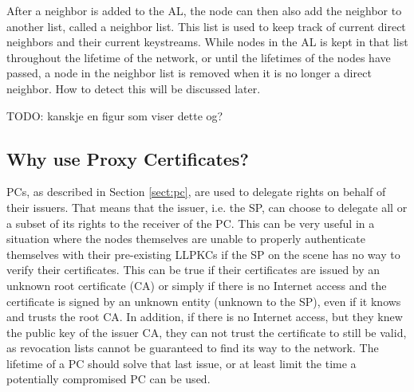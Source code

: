 
After a neighbor is added to the \ac{AL}, the node can then also add the
neighbor to another list, called a neighbor list. This list is used to keep
track of current direct neighbors and their current keystreams. While nodes in
the \ac{AL} is kept in that list throughout the lifetime of the network, or
until the lifetimes of the nodes have passed, a node in the neighbor list is
removed when it is no longer a direct neighbor. How to detect this will be
discussed later.

TODO: kanskje en figur som viser dette og?

\subsection{Why use Proxy Certificates?}
\acp{PC}, as described in Section \ref{sect:pc}, are used to delegate
rights on behalf of their issuers. That means that the issuer, i.e. the \ac{SP},
can choose to delegate all or a subset of its rights to the receiver of the
\ac{PC}. This can be very useful in a situation where the nodes themselves are
unable to properly authenticate themselves with their pre-existing \acp{LLPKC}
if the \ac{SP} on the scene has no way to verify their certificates. This can be
true if their certificates are issued by an unknown root certificate (\ac{CA})
or simply if there is no Internet access and the certificate is signed by an
unknown entity (unknown to the \ac{SP}), even if it knows and trusts the root
\ac{CA}. In addition, if there is no Internet access, but they knew the public
key of the issuer \ac{CA}, they can not trust the certificate to still be valid,
as revocation lists cannot be guaranteed to find its way to the network. The
lifetime of a \ac{PC} should solve that last issue, or at least limit the time a
potentially compromised \ac{PC} can be used.

